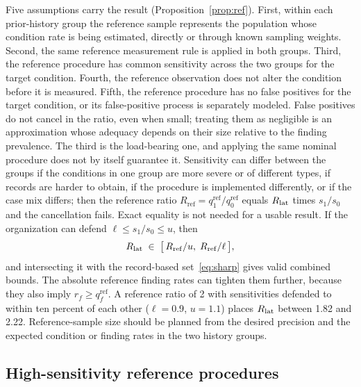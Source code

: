 Five assumptions carry the result (Proposition~\ref{prop:ref}). First, within
each prior-history group the reference sample represents the population whose
condition rate is being estimated, directly or through known sampling
weights. Second, the same reference measurement rule is applied in both
groups. Third, the reference procedure has common sensitivity across the two
groups for the target condition. Fourth, the reference observation does not
alter the condition before it is measured. Fifth, the reference procedure has
no false positives for the target condition, or its false-positive process is
separately modeled. False positives do not cancel in the ratio, even when
small; treating them as negligible is an approximation whose adequacy depends
on their size relative to the finding prevalence. The third is the
load-bearing one,
and applying the same nominal procedure does not by itself guarantee it.
Sensitivity can differ between the groups if the conditions in one group are
more severe or of different types, if records are harder to obtain, if the
procedure is implemented differently, or if the case mix differs; then the
reference ratio $R_{\mathrm{ref}} = q^{\mathrm{ref}}_1/q^{\mathrm{ref}}_0$
equals $R_{\mathrm{lat}}$ times $s_1/s_0$ and the cancellation fails. Exact equality is
not needed for a usable result. If the organization can defend $\ell \le
s_1/s_0 \le u$, then
%
\begin{equation}\label{eq:refrange}
  R_{\mathrm{lat}} \;\in\; \bigl[\, R_{\mathrm{ref}}/u,\; R_{\mathrm{ref}}/\ell \,\bigr] ,
\end{equation}
%
and intersecting it with the record-based set~\eqref{eq:sharp} gives valid
combined bounds. The absolute reference finding rates can tighten them
further, because they also imply $r_f \ge q^{\mathrm{ref}}_f$. A reference
ratio of 2 with sensitivities defended to within ten percent of each other
($\ell = 0.9$, $u = 1.1$) places $R_{\mathrm{lat}}$ between 1.82 and 2.22. Reference-sample size should be planned from the desired
precision and the expected condition or finding rates in the two history
groups.

\subsection{High-sensitivity reference procedures}


